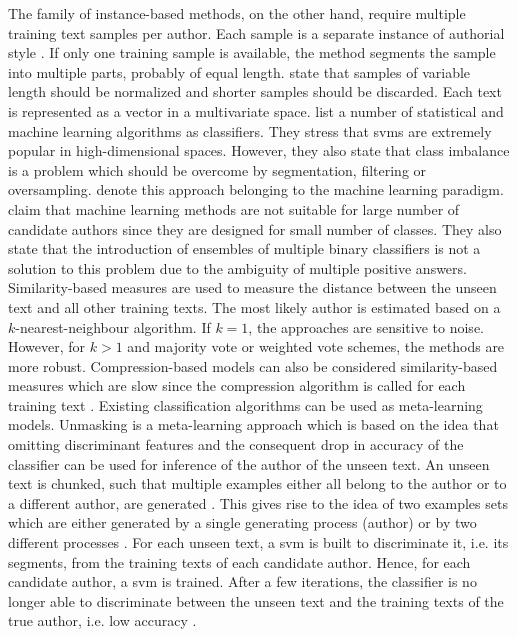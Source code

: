 The family of instance-based methods, on the other hand, require multiple training text samples per author. 
Each sample is a separate instance of authorial style \cite{stamatatos_survey_2009,altakrori_topic_2021,elmanarelbouanani_authorship_2014,neal_surveying_2018}.
If only one training sample is available, the method segments the sample into multiple parts, probably of equal length.
\citet{stamatatos_survey_2009} state that samples of variable length should be normalized and 
shorter samples should be discarded.
Each text is represented as a vector in a multivariate space.
\citet{stamatatos_survey_2009} list a number of statistical and machine learning algorithms as classifiers.
They stress that \acp{svm} are extremely popular in high-dimensional spaces.
However, they also state that class imbalance is a problem 
which should be overcome by segmentation, filtering or oversampling.
\citet{koppel_authorship_2011,koppel_determining_2014} denote this approach belonging to the machine learning paradigm.
\citet{koppel_determining_2014} claim that machine learning methods are not suitable for large number of candidate authors 
since they are designed for small number of classes. 
They also state that the introduction of ensembles of multiple binary classifiers is not a solution to this problem 
due to the ambiguity of multiple positive answers.
Similarity-based measures are used to measure the distance between the unseen text and all other training texts.
The most likely author is estimated based on a $k$-nearest-neighbour algorithm.
If $k=1$, the approaches are sensitive to noise.
However, for $k>1$ and majority vote or weighted vote schemes, the methods are more robust.
Compression-based models can also be considered similarity-based measures which are slow 
since the compression algorithm is called for each training text \cite{stamatatos_survey_2009,neal_surveying_2018}.
Existing classification algorithms can be used as meta-learning models.
Unmasking is a meta-learning approach which is based on the idea that
omitting discriminant features and the consequent drop in accuracy of the classifier 
can be used for inference of the author of the unseen text.
An unseen text is chunked, such that multiple examples either all belong to the author or to a different author, 
are generated \cite{koppel_authorship_2004}.
This gives rise to the idea of two examples sets which are either generated by a single generating process (author) 
or by two different processes \cite{koppel_authorship_2004}.
For each unseen text, a \ac{svm} is built to discriminate it, i.e. its segments, 
from the training texts of each candidate author.
Hence, for each candidate author, a \ac{svm} is trained.
After a few iterations, the classifier is no longer able to discriminate between the unseen text and 
the training texts of the true author, i.e. low accuracy \cite{stamatatos_survey_2009,koppel_authorship_2004}.


